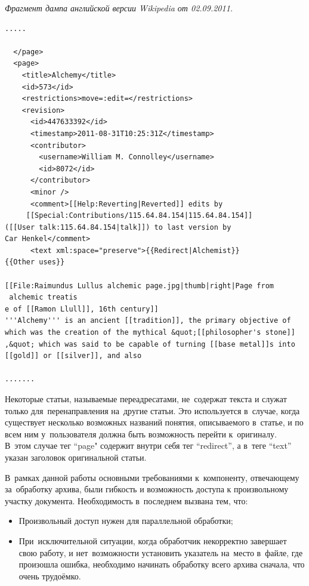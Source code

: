 \begin{center}
\textit{Фрагмент дампа английской версии Wikipedia от 02.09.2011.}
\end{center}
\begin{verbatim}
.....

  </page>
  <page>
    <title>Alchemy</title>
    <id>573</id>
    <restrictions>move=:edit=</restrictions>
    <revision>
      <id>447633392</id>
      <timestamp>2011-08-31T10:25:31Z</timestamp>
      <contributor>
        <username>William M. Connolley</username>
        <id>8072</id>
      </contributor>
      <minor />
      <comment>[[Help:Reverting|Reverted]] edits by
	 [[Special:Contributions/115.64.84.154|115.64.84.154]] 
([[User talk:115.64.84.154|talk]]) to last version by 
Car Henkel</comment>
      <text xml:space="preserve">{{Redirect|Alchemist}}
{{Other uses}}

[[File:Raimundus Lullus alchemic page.jpg|thumb|right|Page from
 alchemic treatis
e of [[Ramon Llull]], 16th century]]
'''Alchemy''' is an ancient [[tradition]], the primary objective of 
which was the creation of the mythical &quot;[[philosopher's stone]]
,&quot; which was said to be capable of turning [[base metal]]s into 
[[gold]] or [[silver]], and also

.......
\end{verbatim}

Некоторые статьи, называемые переадресатами, не~содержат текста и служат только для~перенаправления на~другие статьи. 
Это используется в~случае, когда существует несколько возможных названий понятия, 
описываемого в~статье, и по всем ним у~пользователя должна быть возможность перейти к~оригиналу.
В~этом случае тег ``page" содержит внутри себя тег ``redirect'', 
а в~теге ``text'' указан заголовок оригинальной статьи.

В~рамках данной работы основными требованиями к~компоненту, 
отвечающему за~обработку архива, были гибкость и возможность доступа к произвольному участку документа.
Необходимость в~последнем вызвана тем, что:

\begin{itemize}

\item{
Произвольный доступ нужен для параллельной обработки;
}

\item{
При~исключительной ситуации, когда  обработчик некорректно завершает свою работу, 
и нет~возможности установить указатель на~место в~файле, где произошла ошибка,
необходимо начинать обработку всего архива сначала, что очень трудоёмко.
}

\end{itemize}

